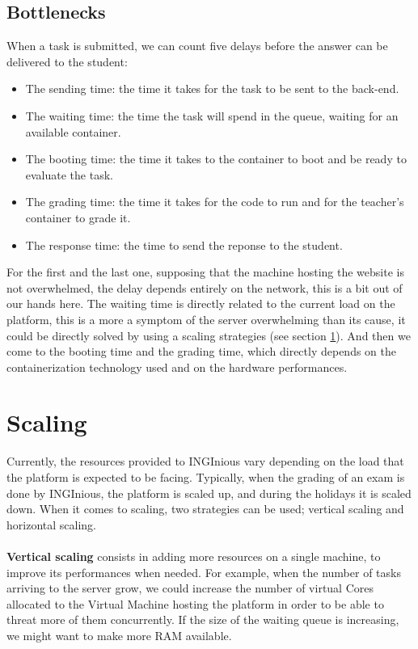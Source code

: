 \subsection{Bottlenecks}
When a task is submitted, we can count five delays before the answer can be delivered to the student:
\begin{itemize}
  \item The sending time: the time it takes for the task to be sent to the back-end.
  \item The waiting time: the time the task will spend in the queue, waiting for an available container.
  \item The booting time: the time it takes to the container to boot and be ready to evaluate the task.
  \item The grading time: the time it takes for the code to run and for the teacher's container to grade it.
  \item The response time: the time to send the reponse to the student.
\end{itemize}
For the first and the last one, supposing that the machine hosting the website is not overwhelmed, the delay depends entirely on the network, this is a bit out of our hands here.  The waiting time is directly related to the current load on the platform, this is a more a symptom of the server overwhelming than its cause, it could be directly solved by using a scaling strategies (see section \ref{section:scaling}).  And then we come to the booting time and the grading time, which directly depends on the containerization technology used and on the hardware performances.

\section{Scaling} \label{section:scaling}
Currently, the resources provided to INGInious vary depending on the load that the platform is expected to be facing.  Typically, when the grading of an exam is done by INGInious, the platform is scaled up, and during the holidays it is scaled down.  When it comes to scaling, two strategies can be used; vertical scaling and horizontal scaling.

\paragraph{} \textbf{Vertical scaling} consists in adding more resources on a single machine, to improve its performances when needed.  For example, when the number of tasks arriving to the server grow, we could increase the number of virtual Cores allocated to the Virtual Machine hosting the platform in order to be able to threat more of them concurrently.  If the size of the waiting queue is increasing, we might want to make more RAM available.

